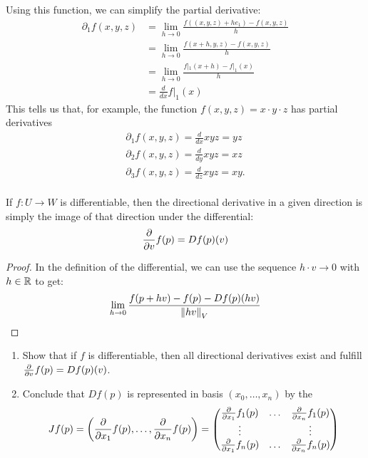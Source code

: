 Using this function, we can simplify the partial derivative:
\begin{align*}
	\partial_1 f(x,y,z) 
	&= \lim_{h \to 0} \frac{f((x,y,z) + he_1) - f(x,y,z)}{h}\\
	&= \lim_{h \to 0} \frac{f(x+h,y,z) - f(x,y,z)}{h}\\
	&= \lim_{h \to 0} \frac{f|_1(x+h) - f|_1(x)}{h}\\
	&= \frac{d}{dx} f|_1(x)
\end{align*}
This tells us that, for example, the function $f(x,y,z) = x \cdot y \cdot z$ has partial derivatives
\begin{align*}
	\partial_1 f(x,y,z) = \frac{d}{dx} xyz = yz\\
	\partial_2 f(x,y,z) = \frac{d}{dy} xyz = xz\\
	\partial_3 f(x,y,z) = \frac{d}{dz} xyz = xy.\\
\end{align*}
\begin{importanttheorem}{}{}
	If $f : U \to W$ is differentiable, then the directional derivative in a given direction is simply the image of that direction under the differential:
	\begin{align*}
		\pderivative{v} f(p) = Df(p)(v)
	\end{align*}
\end{importanttheorem}
\begin{proof}
	In the definition of the differential, we can use the sequence $h \cdot v \to 0$ with $h \in \mathbb{R}$ to get:
	\begin{align*}
		\lim_{h \to 0} \frac{f(p + hv) - f(p) - Df(p)(hv)}{\norm{hv}_V}
	\end{align*}
\end{proof}
\begin{exercise}
	\begin{enumerate}
		\item Show that if $f$ is differentiable, then all directional derivatives exist and fulfill $\pderivative{v} f(p) = Df(p)(v)$.
		\item Conclude that $Df(p)$ is represented in basis $(x_0, \hdots, x_n)$ by the 
		\begin{align*}
			Jf(p)
			=
			\lr(\pderivative{x_1} f(p), \hdots, \pderivative{x_n} f(p))
			=
			\begin{pmatrix}
				\pderivative{x_1}f_1(p) & \hdots & \pderivative{x_n}f_1(p)\\
				\vdots && \vdots\\
				\pderivative{x_1}f_n(p) & \hdots & \pderivative{x_n}f_n(p)
			\end{pmatrix}
		\end{align*}
	
	\end{enumerate}
\end{exercise}
